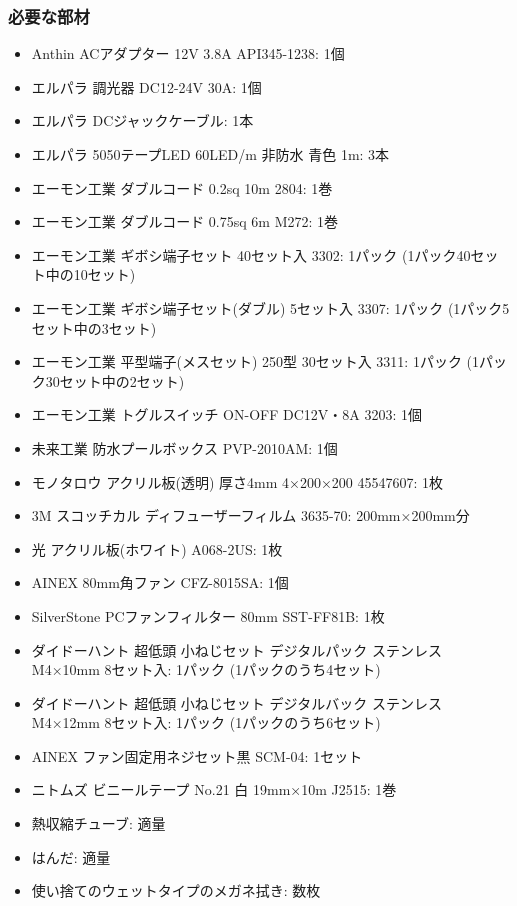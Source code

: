 \documentclass[titlepage,10pt,a4paper,uplatex]{jsbook}
\begin{document}
\subsubsection{必要な部材}
\begin{itemize}
\item Anthin ACアダプター 12V 3.8A API345-1238: 1個
\item エルパラ 調光器 DC12-24V 30A: 1個
\item エルパラ DCジャックケーブル: 1本
\item エルパラ 5050テープLED 60LED/m 非防水 青色 1m: 3本
\item エーモン工業 ダブルコード 0.2sq 10m 2804: 1巻
\item エーモン工業 ダブルコード 0.75sq 6m M272: 1巻
\item エーモン工業 ギボシ端子セット 40セット入 3302: 1パック (1パック40セット中の10セット)
\item エーモン工業 ギボシ端子セット(ダブル) 5セット入 3307: 1パック (1パック5セット中の3セット)
\item エーモン工業 平型端子(メスセット) 250型 30セット入 3311: 1パック (1パック30セット中の2セット)
\item エーモン工業 トグルスイッチ ON-OFF DC12V・8A 3203: 1個
\item 未来工業 防水プールボックス PVP-2010AM: 1個
\item モノタロウ アクリル板(透明) 厚さ4mm 4×200×200 45547607: 1枚
\item 3M スコッチカル ディフューザーフィルム 3635-70: 200mm×200mm分
\item 光 アクリル板(ホワイト) A068-2US: 1枚
\item AINEX 80mm角ファン CFZ-8015SA: 1個
\item SilverStone PCファンフィルター 80mm SST-FF81B: 1枚
\item ダイドーハント 超低頭 小ねじセット デジタルパック ステンレス M4×10mm 8セット入: 1パック (1パックのうち4セット)
\item ダイドーハント 超低頭 小ねじセット デジタルバック ステンレス M4×12mm 8セット入: 1パック (1パックのうち6セット)
\item AINEX ファン固定用ネジセット黒 SCM-04: 1セット
\item ニトムズ ビニールテープ No.21 白 19mm×10m J2515: 1巻
\item 熱収縮チューブ: 適量
\item はんだ: 適量
\item 使い捨てのウェットタイプのメガネ拭き: 数枚
\end{itemize}
\end{document}
